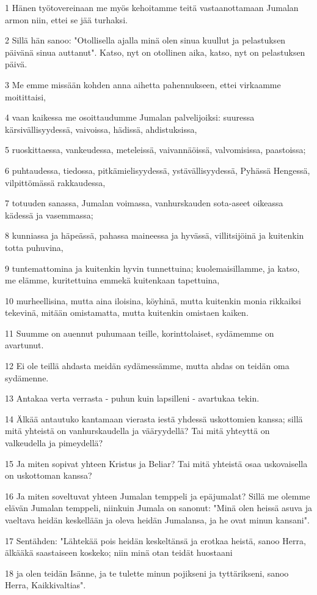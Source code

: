 \par 1 Hänen työtovereinaan me myös kehoitamme teitä vastaanottamaan Jumalan armon niin, ettei se jää turhaksi.
\par 2 Sillä hän sanoo: "Otollisella ajalla minä olen sinua kuullut ja pelastuksen päivänä sinua auttanut". Katso, nyt on otollinen aika, katso, nyt on pelastuksen päivä.
\par 3 Me emme missään kohden anna aihetta pahennukseen, ettei virkaamme moitittaisi,
\par 4 vaan kaikessa me osoittaudumme Jumalan palvelijoiksi: suuressa kärsivällisyydessä, vaivoissa, hädissä, ahdistuksissa,
\par 5 ruoskittaessa, vankeudessa, meteleissä, vaivannäöissä, valvomisissa, paastoissa;
\par 6 puhtaudessa, tiedossa, pitkämielisyydessä, ystävällisyydessä, Pyhässä Hengessä, vilpittömässä rakkaudessa,
\par 7 totuuden sanassa, Jumalan voimassa, vanhurskauden sota-aseet oikeassa kädessä ja vasemmassa;
\par 8 kunniassa ja häpeässä, pahassa maineessa ja hyvässä, villitsijöinä ja kuitenkin totta puhuvina,
\par 9 tuntemattomina ja kuitenkin hyvin tunnettuina; kuolemaisillamme, ja katso, me elämme, kuritettuina emmekä kuitenkaan tapettuina,
\par 10 murheellisina, mutta aina iloisina, köyhinä, mutta kuitenkin monia rikkaiksi tekevinä, mitään omistamatta, mutta kuitenkin omistaen kaiken.
\par 11 Suumme on auennut puhumaan teille, korinttolaiset, sydämemme on avartunut.
\par 12 Ei ole teillä ahdasta meidän sydämessämme, mutta ahdas on teidän oma sydämenne.
\par 13 Antakaa verta verrasta - puhun kuin lapsilleni - avartukaa tekin.
\par 14 Älkää antautuko kantamaan vierasta iestä yhdessä uskottomien kanssa; sillä mitä yhteistä on vanhurskaudella ja vääryydellä? Tai mitä yhteyttä on valkeudella ja pimeydellä?
\par 15 Ja miten sopivat yhteen Kristus ja Beliar? Tai mitä yhteistä osaa uskovaisella on uskottoman kanssa?
\par 16 Ja miten soveltuvat yhteen Jumalan temppeli ja epäjumalat? Sillä me olemme elävän Jumalan temppeli, niinkuin Jumala on sanonut: "Minä olen heissä asuva ja vaeltava heidän keskellään ja oleva heidän Jumalansa, ja he ovat minun kansani".
\par 17 Sentähden: "Lähtekää pois heidän keskeltänsä ja erotkaa heistä, sanoo Herra, älkääkä saastaiseen koskeko; niin minä otan teidät huostaani
\par 18 ja olen teidän Isänne, ja te tulette minun pojikseni ja tyttärikseni, sanoo Herra, Kaikkivaltias".

